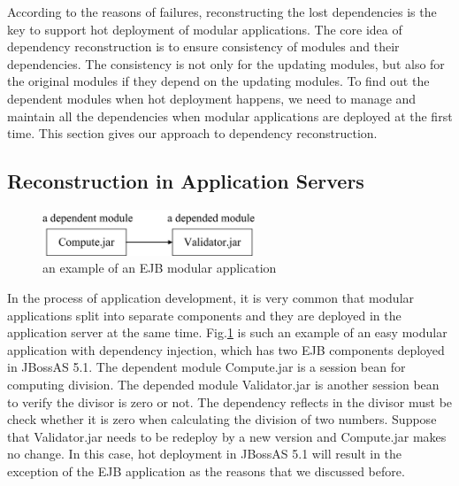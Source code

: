 \documentclass[conference]{IEEEtran}
\begin{document}
According to the reasons of failures, reconstructing the lost dependencies is the key to support hot deployment of modular applications.
The core idea of dependency reconstruction is to ensure consistency of modules and their dependencies.
The consistency is not only for the updating modules, but also for the original modules if they depend on the updating modules.
To find out the dependent modules when hot deployment happens, we need to manage and maintain all the dependencies when modular applications are deployed at the first time.
This section gives our approach to dependency reconstruction.

\subsection{Reconstruction in Application Servers}

\begin{figure}[!t]
\centering
\includegraphics[width=2.5in]{division_example.jpg}
\caption{an example of an EJB modular application}
\label{fig:division_example}
\end{figure}

In the process of application development, it is very common that modular applications split into separate components and they are deployed in the application server at the same time.
Fig.\ref{fig:division_example} is such an example of an easy modular application with dependency injection\cite{DI}, which has two EJB\cite{EJB} components deployed in JBossAS 5.1. 
The dependent module Compute.jar is a session bean for computing division.
The depended module Validator.jar is another session bean to verify the divisor is zero or not.
The dependency reflects in the divisor must be check whether it is zero when calculating the division of two numbers.
Suppose that Validator.jar needs to be redeploy by a new version and Compute.jar makes no change.
In this case, hot deployment in JBossAS 5.1 will result in the exception of the EJB application as the reasons that we discussed before.
\end{document}

